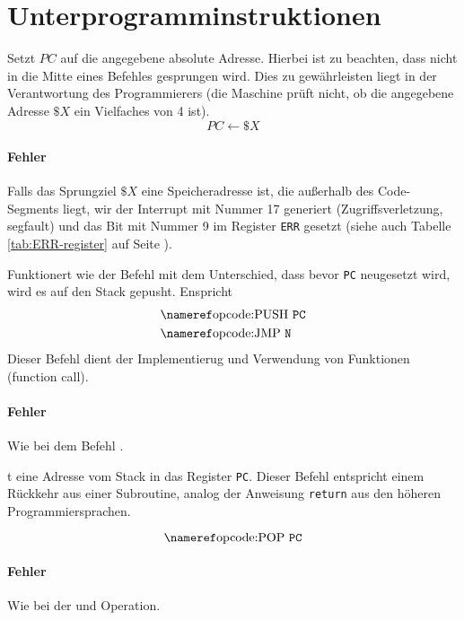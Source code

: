 \section{Unterprogramminstruktionen}

Setzt $PC$ auf die angegebene absolute Adresse. Hierbei ist zu beachten,  dass
nicht in die Mitte eines Befehles gesprungen wird. Dies zu gewährleisten liegt
in der Verantwortung des Programmierers (die Maschine prüft nicht, ob die
angegebene Adresse $\$X$ ein Vielfaches von 4 ist).
\[
    PC \gets \$X
\]

\paragraph{Fehler}
Falls das Sprungziel $\$X$ eine Speicheradresse ist, die außerhalb des
Code-Segments liegt, wir der Interrupt mit Nummer 17 generiert
(Zugriffsverletzung, segfault) und das Bit mit Nummer 9 im Register \texttt{ERR}
gesetzt (siehe auch Tabelle \ref{tab:ERR-register} auf Seite
\pageref{tab:ERR-register}).


Funktionert wie der Befehl  mit dem Unterschied, dass bevor
\texttt{PC} neugesetzt wird, wird es auf den Stack gepusht. Enspricht
\begin{align*}
 & \text{\opref{PUSH} \texttt{PC}} \\
 & \text{\opref{JMP}  \texttt{N}} 
\end{align*}
Dieser Befehl dient der Implementierug und Verwendung von Funktionen (function
call).

\paragraph{Fehler}
Wie bei dem Befehl .


t eine Adresse vom Stack in das Register \texttt{PC}. Dieser Befehl
entspricht einem Rückkehr aus einer Subroutine, analog der Anweisung
\texttt{return} aus den höheren Programmiersprachen.

\[
  \text{\opref{POP} \texttt{PC}} 
\]

\paragraph{Fehler}
Wie bei der  und  Operation.




